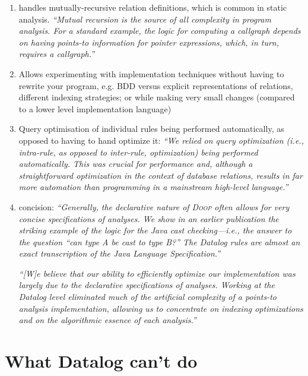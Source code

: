 \begin{enumerate}
\item handles mutually-recursive relation definitions, which is common in static
  analysis. \emph{``Mutual recursion is the source of all complexity in program
    analysis. For a standard example, the logic for computing a callgraph
    depends on having points-to information for pointer expressions, which, in
    turn, requires a callgraph.''}~\citep{DBLP:conf/datalog/SmaragdakisB10}
  
\item Allows experimenting with implementation techniques without having to rewrite your program, e.g. BDD versus explicit representations of relations, different indexing strategies; or while making very small changes (compared to a lower level implementation language)
  
\item Query optimisation of individual rules being performed automatically, as
  opposed to having to hand optimize it: \emph{``We relied on query optimization
    (i.e., intra-rule, as opposed to inter-rule, optimization) being performed
    automatically. This was crucial for performance and, although a
    straightforward optimization in the context of database relations, results
    in far more automation than programming in a mainstream high-level
    language.''}
  
\item concision: \emph{``Generally, the declarative nature of \textsc{Doop}
  often allows for very concise specifications of analyses. We show in an
  earlier publication the striking example of the logic for the Java cast
  checking---i.e., the answer to the question “can type A be cast to type B?”
  The Datalog rules are almost an exact transcription of the Java
  Language Specification.''}

  \emph{``[W]e believe that our ability to efficiently optimize our
    implementation was largely due to the declarative specifications of
    analyses. Working at the Datalog level eliminated much of the artificial
    complexity of a points-to analysis implementation, allowing us to
    concentrate on indexing optimizations and on the algorithmic essence of each
    analysis.''}
\end{enumerate}


\section{What Datalog can't do}

